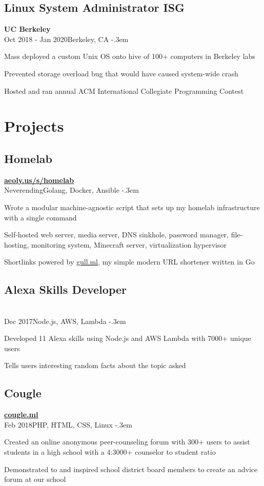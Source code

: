 \documentclass{article}
\let\olditemize=\itemize \let\endolditemize=\enditemize
\renewenvironment{itemize}{\olditemize[topsep=0em] \itemsep-.3em}{\endolditemize}
\newcommand{\link}[1]{\href{https://#1}{#1}}
\newcommand{\entry}[3]{\quad\textbf{#1}\\#2\qquad#3}
\begin{document}
\subsection{Linux System Administrator ISG}
\entry{UC Berkeley}{Oct 2018 - Jan 2020}{Berkeley, CA}
\begin{itemize}
  \item Mass deployed a custom Unix OS onto hive of 100+ computers in Berkeley labs
  \item Prevented storage overload bug that would have caused system-wide crash
  \item Hosted and ran annual ACM International Collegiate Programming Contest
\end{itemize}


\section{Projects}

\subsection{Homelab}
\entry{\link{aeoly.us/s/homelab}}{Neverending}{Golang, Docker, Ansible}
\begin{itemize}
  \item Wrote a modular machine-agnostic script that sets up my homelab infrastructure with a single command
  \item Self-hosted web server, media server, DNS sinkhole, password manager, file-hosting, monitoring system, Minecraft server, virtualization hypervisor
  \item Shortlinks powered by \link{gull.ml}, my simple modern URL shortener written in Go
\end{itemize}

\subsection{Alexa Skills Developer}
\entry{}{Dec 2017}{Node.js, AWS, Lambda}
\begin{itemize}
  \item Developed 11 Alexa skills using Node.js and AWS Lambda with 7000+ unique users
  \item Tells users interesting random facts about the topic asked
\end{itemize}

\subsection{Cougle}
\entry{\link{cougle.ml}}{Feb 2018}{PHP, HTML, CSS, Linux}
\begin{itemize}
  \item Created an online anonymous peer-counseling forum with 300+ users to assist
    students in a high school with a 4:3000+ counselor to student ratio
  \item Demonstrated to and inspired school district board members to create an
    advice forum at our school
\end{itemize}
\end{document}

